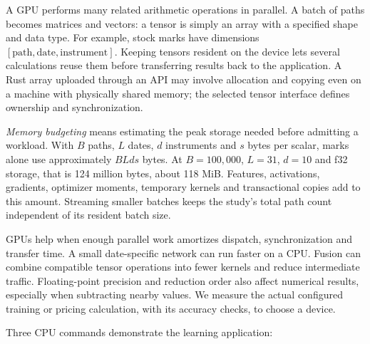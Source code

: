 \documentclass[8pt]{strategynet-journal}
\begin{document}
\begin{SNcolumns}
\begin{center}\begin{minipage}{\linewidth}\centering
{}
\end{minipage}\end{center}

A GPU performs many related arithmetic operations in parallel. A batch of
paths becomes matrices and vectors: a tensor is simply an array with a
specified shape and data type. For example, stock marks have dimensions
$[\text{path},\text{date},\text{instrument}]$. Keeping tensors resident on
the device lets several calculations reuse them before transferring results
back to the application. A Rust array uploaded through an API may involve
allocation and copying even on a machine with physically shared memory;
the selected tensor interface defines ownership and synchronization.

\emph{Memory budgeting} means estimating the peak storage needed before
admitting a workload. With $B$ paths, $L$ dates, $d$ instruments and $s$ bytes
per scalar, marks alone use approximately $BLds$ bytes. At $B=100{,}000$,
$L=31$, $d=10$ and f32 storage, that is 124 million bytes, about 118 MiB.
Features, activations, gradients, optimizer moments, temporary kernels and
transactional copies add to this amount. Streaming smaller batches keeps
the study's total path count independent of its resident batch size.

GPUs help when enough parallel work amortizes dispatch, synchronization and
transfer time. A small date-specific network can run faster on a CPU. Fusion
can combine compatible tensor operations into fewer kernels and reduce
intermediate traffic. Floating-point precision and reduction order also
affect numerical results, especially when subtracting nearby values. We
measure the actual configured training or pricing calculation, with its
accuracy checks, to choose a device.

Three CPU commands demonstrate the learning application:
\end{SNcolumns}
\end{document}
